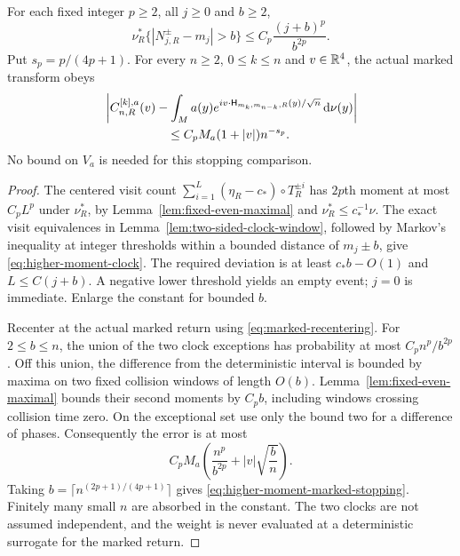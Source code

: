 \begin{proposition}
\label{prop:higher-moment-marked-stopping}
For each fixed integer $p\ge2$, all $j\ge0$ and $b\ge2$,
\begin{equation}\label{eq:higher-moment-clock}
 \nu_R^*\{|N^\pm_{j,R}-m_j|>b\}
             \le C_p\frac{(j+b)^p}{b^{2p}}.
\end{equation}
Put $s_p=p/(4p+1)$. For every $n\ge2$, $0\le k\le n$ and
$v\in\mathbb R^4$, the actual marked transform obeys
\begin{align}
 &\left|C^{[k],a}_{n,R}(v)
 -\int_M a(y)e^{iv\cdot\mathsf H_{m_k,m_{n-k},R}(y)/\sqrt n}
                       \dd\nu(y)\right|\notag\\
 &\hspace{18mm}\le C_pM_a(1+|v|)n^{-s_p}.
 \label{eq:higher-moment-marked-stopping}
\end{align}
No bound on $V_a$ is needed for this stopping comparison.
\end{proposition}
\begin{proof}
The centered visit count
$\sum_{i=1}^L(\eta_R-c_*)\circ T_R^{\pm i}$ has $2p$th moment at
most $C_pL^p$ under $\nu_R^*$, by
Lemma~\ref{lem:fixed-even-maximal} and $\nu_R^*\le c_*^{-1}\nu$.
The exact visit equivalences in
Lemma~\ref{lem:two-sided-clock-window}, followed by Markov's
inequality at integer thresholds within a bounded distance of
$m_j\pm b$, give \eqref{eq:higher-moment-clock}. The required
deviation is at least $c_*b-O(1)$ and $L\le C(j+b)$.
A negative lower threshold yields an empty event; $j=0$ is immediate.
Enlarge the constant for bounded $b$.

Recenter at the actual marked return using
\eqref{eq:marked-recentering}. For $2\le b\le n$, the union of the
two clock exceptions has probability at most $C_pn^p/b^{2p}$.
Off this union, the difference from the deterministic interval is
bounded by maxima on two fixed collision windows of length $O(b)$.
Lemma~\ref{lem:fixed-even-maximal} bounds their second moments by
$C_pb$, including windows crossing collision time zero. On the
exceptional set use only the bound two for a difference of phases.
Consequently the error is at most
\[
 C_pM_a\left(\frac{n^p}{b^{2p}}+|v|\sqrt{\frac bn}\right).
\]
Taking $b=\lceil n^{(2p+1)/(4p+1)}\rceil$ gives
\eqref{eq:higher-moment-marked-stopping}. Finitely many small $n$
are absorbed in the constant. The two clocks are not assumed
independent, and the weight is never evaluated at a deterministic
surrogate for the marked return.
\end{proof}

